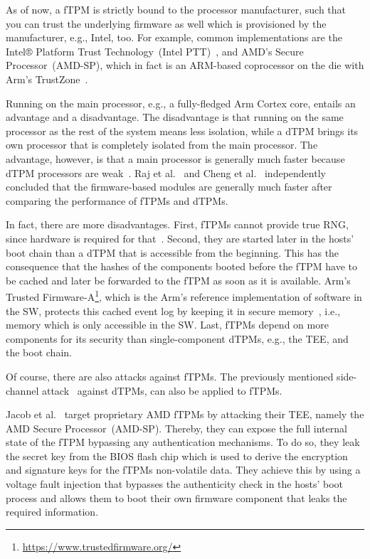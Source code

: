 As of now, a fTPM is strictly bound to the processor manufacturer, such that you can trust the underlying firmware as well which is provisioned by the manufacturer, e.g., Intel, too. For example, common implementations are the Intel® Platform Trust Technology~(Intel PTT)~\cite{intelProcessorSecurity}, and AMD's Secure Processor~(AMD-SP), which in fact is an ARM-based coprocessor on the die with Arm's TrustZone~\cite{Khalid2020}.

Running on the main processor, e.g., a fully-fledged Arm Cortex core, entails an advantage and a disadvantage. The disadvantage is that running on the same processor as the rest of the system means less isolation, while a \ac{dTPM} brings its own processor that is completely isolated from the main processor. The advantage, however, is that a main processor is generally much faster because \ac{dTPM} processors are weak~\cite{Goh2013, Raj2015}. Raj et al.~\cite{Raj2015} and Cheng et al.~\cite{Cheng2020} independently concluded that the firmware-based modules are generally much faster after comparing the performance of \acp{fTPM} and \acp{dTPM}.

In fact, there are more disadvantages. First, \acp{fTPM} cannot provide true RNG, since hardware is required for that~\cite{Stipcevic2014}.
Second, they are started later in the hosts' boot chain than a dTPM that is accessible from the beginning. This has the consequence that the hashes of the components booted before the fTPM have to be cached and later be forwarded to the \ac{fTPM} as soon as it is available. Arm's Trusted Firmware-A\footnote{\url{https://www.trustedfirmware.org/}}, which is the Arm's reference implementation of software in the \ac{SW}, protects this cached event log by keeping it in secure memory~\cite{tf-a-measured-boot}, i.e., memory which is only accessible in the \ac{SW}. Last, fTPMs depend on more components for its security than single-component dTPMs, e.g., the \ac{TEE}, and the boot chain.

Of course, there are also attacks against fTPMs.
The previously mentioned side-channel attack~\cite{Moghimi2019} against dTPMs, can also be applied to fTPMs.

Jacob et al.~\cite{Jacob2023} target proprietary AMD fTPMs by attacking their \ac{TEE}, namely the AMD Secure Processor~(AMD-SP). Thereby, they can expose the full internal state of the fTPM bypassing any authentication mechanisms. To do so, they leak the secret key from the BIOS flash chip which is used to derive the encryption and signature keys for the fTPMs non-volatile data. They achieve this by using a voltage fault injection that bypasses the authenticity check in the hosts' boot process and allows them to boot their own firmware component that leaks the required information.

